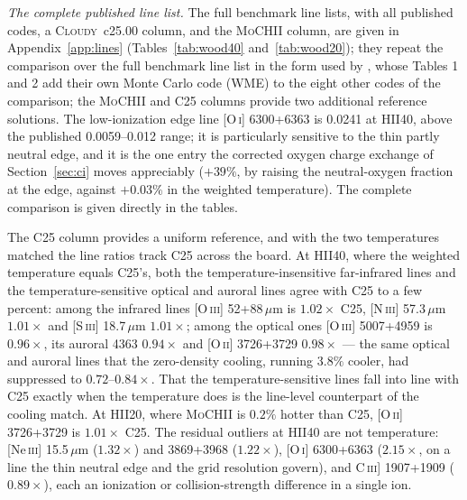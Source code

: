 \documentclass[twocolumn,linenumbers]{aastex702}
\newcommand{\MoCHII}{\textsc{MoCHII}}
\begin{document}
\emph{The complete published line list.}  The full benchmark line lists,
with all published codes, a \textsc{Cloudy}~c25.00 column, and the
\MoCHII{} column, are given in Appendix~\ref{app:lines}
(Tables~\ref{tab:wood40} and~\ref{tab:wood20}); they repeat the comparison
over the full benchmark line list in
the form used by \citet{wood2004}, whose Tables 1 and 2 add their own Monte
Carlo code (WME) to the eight other codes of the comparison; the
\MoCHII{} and C25 columns provide two additional reference solutions.  The
low-ionization edge line [O\,\textsc{i}]
6300+6363 is 0.0241 at HII40, above the published 0.0059--0.012 range; it is
particularly sensitive to the thin partly neutral edge, and it is the one
entry the corrected oxygen charge exchange of Section~\ref{sec:ci} moves
appreciably ($+39\%$, by raising the neutral-oxygen fraction at the edge,
against $+0.03\%$ in the weighted temperature).  The complete
comparison is given directly in the tables.

The C25 column provides a uniform reference, and with the two temperatures
matched the line
ratios track C25 across the board.  At HII40, where the weighted temperature
equals C25's, both the temperature-insensitive far-infrared lines and the
temperature-sensitive optical and auroral lines agree with C25 to a few
percent: among the infrared lines [O\,\textsc{iii}] 52+88\,$\mu$m is
$1.02\times$ C25, [N\,\textsc{iii}] 57.3\,$\mu$m $1.01\times$ and
[S\,\textsc{iii}] 18.7\,$\mu$m $1.01\times$; among the optical ones
[O\,\textsc{iii}] 5007+4959 is $0.96\times$, its auroral 4363 $0.94\times$
and [O\,\textsc{ii}] 3726+3729 $0.98\times$ --- the same optical and auroral
lines that the zero-density cooling, running $3.8\%$ cooler, had suppressed
to $0.72$--$0.84\times$.  That the temperature-sensitive lines fall into
line with C25 exactly when the temperature does is the line-level
counterpart of the cooling match.  At HII20, where \MoCHII{} is $0.2\%$
hotter than C25, [O\,\textsc{ii}] 3726+3729 is $1.01\times$ C25.  The
residual outliers at HII40 are not temperature: [Ne\,\textsc{iii}]
15.5\,$\mu$m ($1.32\times$) and 3869+3968 ($1.22\times$),
[O\,\textsc{i}] 6300+6363 ($2.15\times$, on a line the thin neutral edge and
the grid resolution govern), and C\,\textsc{iii}] 1907+1909 ($0.89\times$),
each an ionization or collision-strength difference in a single ion.
\end{document}
